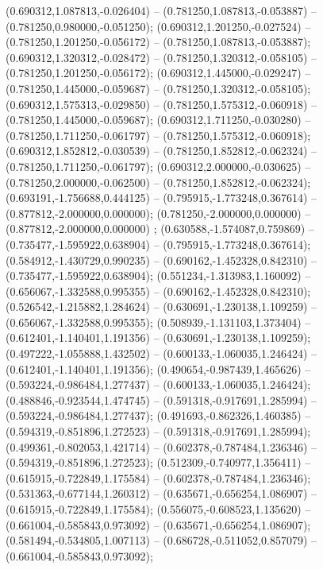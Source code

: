  (0.690312,1.087813,-0.026404) -- (0.781250,1.087813,-0.053887) -- (0.781250,0.980000,-0.051250);
 (0.690312,1.201250,-0.027524) -- (0.781250,1.201250,-0.056172) -- (0.781250,1.087813,-0.053887);
 (0.690312,1.320312,-0.028472) -- (0.781250,1.320312,-0.058105) -- (0.781250,1.201250,-0.056172);
 (0.690312,1.445000,-0.029247) -- (0.781250,1.445000,-0.059687) -- (0.781250,1.320312,-0.058105);
 (0.690312,1.575313,-0.029850) -- (0.781250,1.575312,-0.060918) -- (0.781250,1.445000,-0.059687);
 (0.690312,1.711250,-0.030280) -- (0.781250,1.711250,-0.061797) -- (0.781250,1.575312,-0.060918);
 (0.690312,1.852812,-0.030539) -- (0.781250,1.852812,-0.062324) -- (0.781250,1.711250,-0.061797);
 (0.690312,2.000000,-0.030625) -- (0.781250,2.000000,-0.062500) -- (0.781250,1.852812,-0.062324);
 (0.693191,-1.756688,0.444125) -- (0.795915,-1.773248,0.367614) -- (0.877812,-2.000000,0.000000);
 (0.781250,-2.000000,0.000000) -- (0.877812,-2.000000,0.000000) ;
 (0.630588,-1.574087,0.759869) -- (0.735477,-1.595922,0.638904) -- (0.795915,-1.773248,0.367614);
 (0.584912,-1.430729,0.990235) -- (0.690162,-1.452328,0.842310) -- (0.735477,-1.595922,0.638904);
 (0.551234,-1.313983,1.160092) -- (0.656067,-1.332588,0.995355) -- (0.690162,-1.452328,0.842310);
 (0.526542,-1.215882,1.284624) -- (0.630691,-1.230138,1.109259) -- (0.656067,-1.332588,0.995355);
 (0.508939,-1.131103,1.373404) -- (0.612401,-1.140401,1.191356) -- (0.630691,-1.230138,1.109259);
 (0.497222,-1.055888,1.432502) -- (0.600133,-1.060035,1.246424) -- (0.612401,-1.140401,1.191356);
 (0.490654,-0.987439,1.465626) -- (0.593224,-0.986484,1.277437) -- (0.600133,-1.060035,1.246424);
 (0.488846,-0.923544,1.474745) -- (0.591318,-0.917691,1.285994) -- (0.593224,-0.986484,1.277437);
 (0.491693,-0.862326,1.460385) -- (0.594319,-0.851896,1.272523) -- (0.591318,-0.917691,1.285994);
 (0.499361,-0.802053,1.421714) -- (0.602378,-0.787484,1.236346) -- (0.594319,-0.851896,1.272523);
 (0.512309,-0.740977,1.356411) -- (0.615915,-0.722849,1.175584) -- (0.602378,-0.787484,1.236346);
 (0.531363,-0.677144,1.260312) -- (0.635671,-0.656254,1.086907) -- (0.615915,-0.722849,1.175584);
 (0.556075,-0.608523,1.135620) -- (0.661004,-0.585843,0.973092) -- (0.635671,-0.656254,1.086907);
 (0.581494,-0.534805,1.007113) -- (0.686728,-0.511052,0.857079) -- (0.661004,-0.585843,0.973092);
